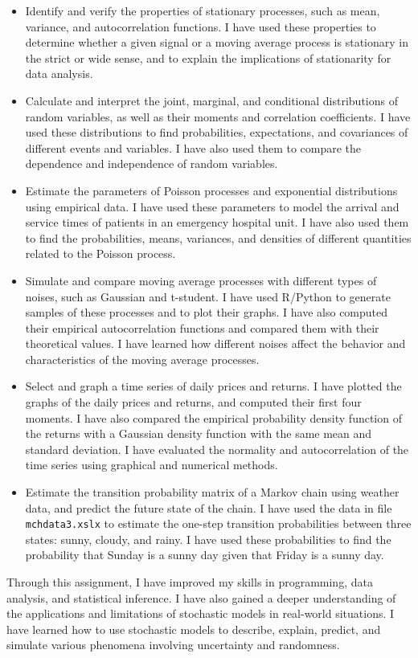 \documentclass[11pt, letterpaper]{article}
\begin{document}
\begin{itemize}
	\item Identify and verify the properties of stationary processes, such
	      as mean,
	      variance, and autocorrelation functions. I have used these properties to
	      determine whether a given signal or a moving average process is stationary in
	      the strict or wide sense, and to explain the implications of stationarity for
	      data analysis.
	\item Calculate and interpret the joint, marginal, and conditional
	      distributions of
	      random variables, as well as their moments and correlation coefficients. I have
	      used these distributions to find probabilities, expectations, and covariances
	      of different events and variables. I have also used them to compare the
	      dependence and independence of random variables.
	\item Estimate the parameters of Poisson processes and exponential
	      distributions
	      using empirical data. I have used these parameters to model the arrival and
	      service times of patients in an emergency hospital unit. I have also used them
	      to find the probabilities, means, variances, and densities of different
	      quantities related to the Poisson process.
	\item Simulate and compare moving average processes with different types of
	      noises,
	      such as Gaussian and t-student. I have used R/Python to generate samples of
	      these processes and to plot their graphs. I have also computed their empirical
	      autocorrelation functions and compared them with their theoretical values. I
	      have learned how different noises affect the behavior and characteristics of
	      the moving average processes.
	\item Select and graph a time series of daily prices and returns. I have
	      plotted the
	      graphs of the daily prices and returns, and computed their first four moments.
	      I have also compared the empirical probability density function of the returns
	      with a Gaussian density function with the same mean and standard deviation. I
	      have evaluated the normality and autocorrelation of the time series using
	      graphical and numerical methods.
	\item Estimate the transition probability matrix of a Markov chain using
	      weather
	      data, and predict the future state of the chain. I have used the data in file
	      \verb|mchdata3.xslx| to estimate the one-step transition probabilities between
	      three
	      states: sunny, cloudy, and rainy. I have used these probabilities to find the
	      probability that Sunday is a sunny day given that Friday is a sunny day.
\end{itemize}

Through this assignment, I have improved my skills in programming, data
analysis, and statistical inference. I have also gained a deeper understanding
of the applications and limitations of stochastic models in real-world
situations. I have learned how to use stochastic models to describe, explain,
predict, and simulate various phenomena involving uncertainty and randomness.
\end{document}
